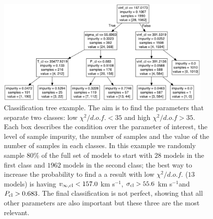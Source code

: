 \documentclass[a4,useAMS,usenatbib,usegraphicx]{mn2e}
\newcommand{\kms}{km s$^{-1}$}
\begin{document}
\begin{figure}
\begin{center}
\includegraphics[width=0.95\textwidth]{tree_result.pdf}
\caption{Classification tree example. 
The aim is to find the parameters that separate two
classes: low $\chi^2/d.o.f. < 35$ and high $\chi^2/d.o.f>35$. 
Each box describes the condition over the parameter of interest, the
level of sample impurity, the number of samples and the value of the
number of samples in each classes.  
In this example we randomly sample $80\%$ of the full set of models to
start with $28$ models in the first class and
$1962$ models in the second class; the best way to increase the
probability to find a  a result with low $\chi^2/d.o.f.$ ($13$ models) is having $v_{\infty,{\rm cl}}<157.0$ \kms,
$\sigma_{{\rm cl}}>55.6$ \kms and $P_{\rm cl}>0.683$.
The final classification is not perfect, showing that all other
parameters are also important but these three are the most relevant.  
\label{fig:tree}}
\end{center}
\end{figure}
\end{document}
